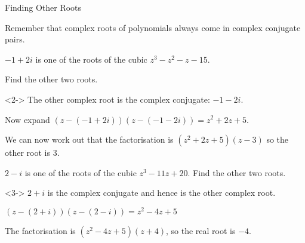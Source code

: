 \documentclass[8pt]{beamer}
\begin{document}
\begin{frame}{Finding Other Roots}
	\begin{definition}
		Remember that complex roots of polynomials always come in complex conjugate pairs.
	\end{definition}

	\begin{problem}
		$-1+2i$ is one of the roots of the cubic $ z^3-z^2-z-15$.

		Find the other two roots.
	\end{problem}
	\begin{solution}<2->
		The other complex root is the complex conjugate: $-1-2i$.

		Now expand  $(z-(-1+2i))(z-(-1-2i))=z^2+2z+5$.

		We can now work out that the factorisation is $(z^2+2z+5)(z-3)$ so the other root is 3.
	\end{solution}

	\begin{problem}
		$2-i$ is one of the roots of the cubic $z^3-11z+20$. Find the other two roots.
	\end{problem}
	\begin{solution}<3->
		$2+i$ is the complex conjugate and hence is the other complex root.

		$(z-(2+i))(z-(2-i))=z^2-4z+5$

		The factorisation is $(z^2-4z+5)(z+4)$, so the real root is $-4$.
	\end{solution}
\end{frame}
\end{document}
